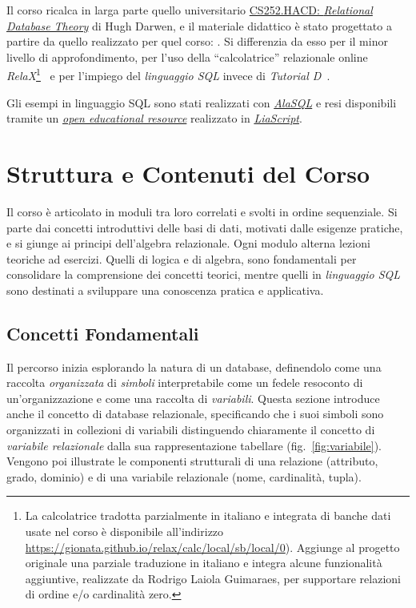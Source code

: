 \documentclass[withtimes]{easychair}
\theoremstyle{definition}
\begin{document}
Il corso ricalca in larga parte quello universitario \href{https://www.dcs.warwick.ac.uk/~hugh/#CS252}{CS252.HACD:
\emph{Relational Database Theory}} di Hugh Darwen, e il  materiale didattico è stato progettato a partire da quello realizzato per quel corso: \cite{darwen2014introduction, darwen2010exercises,darwen2011sql}. Si differenzia da esso per il minor livello di approfondimento, per l'uso della ``calcolatrice'' relazionale online \emph{RelaX}\footnote{La calcolatrice tradotta parzialmente in italiano e integrata di banche dati usate nel corso è disponibile all'indirizzo
\url{https://gionata.github.io/relax/calc/local/sb/local/0}). Aggiunge al progetto originale una parziale traduzione in italiano e integra alcune funzionalità aggiuntive, realizzate da Rodrigo Laiola Guimaraes, per supportare relazioni di ordine e/o cardinalità zero.}~\cite{kessler2019relax} e per l'impiego del \emph{linguaggio SQL} invece di \emph{Tutorial D}~\cite[cap. 5]{date2007databases}.

Gli esempi in linguaggio SQL sono stati realizzati con \href{https://alasql.org/}{\emph{AlaSQL}} e resi disponibili tramite un \href{http://liascript.github.io/course/?https://raw.githubusercontent.com/gionatamassibenincasa/database-didattici/main/algebra_delle_relazioni/README.md}{\emph{open educational resource}} realizzato in \href{https://liascript.github.io/}{\emph{LiaScript}}.

\section{Struttura e Contenuti del Corso}\label{struttura-e-contenuti-del-corso}

Il corso è articolato in moduli tra loro correlati e svolti in ordine sequenziale. Si parte dai concetti introduttivi delle basi di dati, motivati dalle esigenze pratiche, e si giunge ai principi dell'algebra relazionale. Ogni modulo alterna lezioni teoriche ad esercizi. Quelli di logica e di algebra, sono fondamentali per consolidare la comprensione dei concetti teorici, mentre quelli in \emph{linguaggio SQL} sono destinati a sviluppare una conoscenza pratica e applicativa.

\subsection{Concetti Fondamentali}\label{concetti-fondamentali}

Il percorso inizia esplorando la natura di un database, definendolo come una raccolta \emph{organizzata} di \emph{simboli} interpretabile come un fedele resoconto di un'organizzazione e come una raccolta di \emph{variabili}. Questa sezione introduce anche il concetto di database relazionale, specificando che i suoi simboli sono organizzati in collezioni di variabili distinguendo chiaramente il concetto di \emph{variabile relazionale} dalla sua rappresentazione tabellare (fig.~\ref{fig:variabile}). Vengono poi illustrate le componenti strutturali di una relazione (attributo, grado, dominio) e di una variabile relazionale (nome, cardinalità, tupla).
\end{document}
